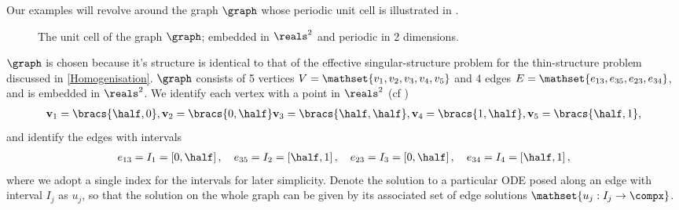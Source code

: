 Our examples will revolve around the graph $\graph$ whose periodic unit cell is illustrated in .
\begin{figure}[b]
\centering
	\caption{The unit cell of the graph $\graph$; embedded in $\reals^{2}$ and periodic in 2 dimensions. \label{fig:GraphODEDiagram}}
\end{figure}
$\graph$ is chosen because it's structure is identical to that of the effective singular-structure problem for the thin-structure problem discussed in \cref{Homogenisation}.
$\graph$ consists of 5 vertices $V=\mathset{v_{1},v_{2},v_{3},v_{4},v_{5}}$ and 4 edges $E = \mathset{e_{13}, e_{35}, e_{23}, e_{34}}$, and is embedded in $\reals^{2}$.
We identify each vertex with a point in $\reals^{2}$ (cf )
\begin{align*}
	\mathbf{v}_{1} = \bracs{\half,0}, \mathbf{v}_{2} = \bracs{0,\half} 
	\mathbf{v}_{3} = \bracs{\half, \half}, 
	\mathbf{v}_{4} = \bracs{1,\half}, \mathbf{v}_{5} = \bracs{\half, 1},
\end{align*}
and identify the edges with intervals
\begin{align*}
	e_{13} = I_{1} = \left[0,\half\right], \quad e_{35} = I_{2} = \left[\half,1\right], \quad
	e_{23} = I_{3} = \left[0,\half\right], \quad e_{34} = I_{4} = \left[\half,1\right],
\end{align*}
where we adopt a single index for the intervals for later simplicity. 
Denote the solution to a particular ODE posed along an edge with interval $I_{j}$ as $u_{j}$, so that the solution on the whole graph can be given by its associated set of edge solutions $\mathset{u_{j}:I_{j}\rightarrow\compx}$. \newline

